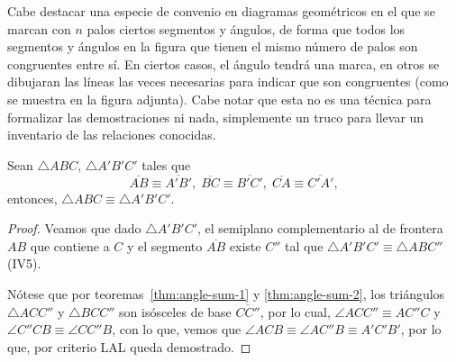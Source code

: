 \documentclass[11pt,a4paper]{book}
\begin{document}
Cabe destacar una especie de convenio en diagramas geométricos en el que se marcan con $n$ palos ciertos segmentos y ángulos, de forma que todos los segmentos y ángulos en la figura que tienen el mismo número de palos son congruentes entre sí. En ciertos casos, el ángulo tendrá una marca, en otros se dibujaran las líneas las veces necesarias para indicar que son congruentes (como se muestra en la figura adjunta). Cabe notar que esta no es una técnica para formalizar las demostraciones ni nada, simplemente un truco para llevar un inventario de las relaciones conocidas.
\begin{figure}
\centering
{}
\caption{}
\end{figure}
\begin{thm}
Sean $\triangle ABC,\,\triangle A'B'C'$ tales que
$$\overline{AB}\equiv\overline{A'B'},\;\overline{BC}\equiv\overline{B'C'},\;\overline{CA}\equiv\overline{C'A'},$$
entonces, $\triangle ABC\equiv\triangle A'B'C'$.
\end{thm}
\begin{proof}
Veamos que dado $\triangle A'B'C'$, el semiplano complementario al de frontera $AB$ que contiene a $C$ y el segmento $\overline{AB}$ existe $C''$ tal que $\triangle A'B'C'\equiv\triangle ABC''$ (IV5).
\begin{figure}
\centering
{}
\end{figure}

Nótese que por teoremas~\ref{thm:angle-sum-1} y \ref{thm:angle-sum-2}, los triángulos $\triangle ACC''$ y $\triangle BCC''$ son isósceles de base $\overline{CC''}$, por lo cual, $\angle ACC''\equiv AC''C$ y $\angle C''CB\equiv\angle CC''B$, con lo que, vemos que $\angle ACB\equiv\angle AC''B\equiv A'C'B'$, por lo que, por criterio LAL queda demostrado.
\end{proof}
\end{document}
